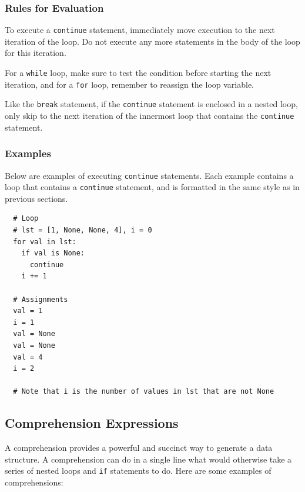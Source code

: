\documentclass{article}
\newcommand{\expr}[1]{\texttt{#1}}
\newcommand{\kw}[1]{\expr{#1}}
\begin{document}
\subsubsection{Rules for Evaluation}

  To execute a \kw{continue} statement, immediately move execution to the next iteration of the loop. Do not execute any more statements in the body of the loop for this iteration.

  For a \kw{while} loop, make sure to test the condition before starting the next iteration, and for a \kw{for} loop, remember to reassign the loop variable.

  Like the \kw{break} statement, if the \kw{continue} statement is enclosed in a nested loop, only skip to the next iteration of the innermost loop that contains the \kw{continue} statement.

\subsubsection{Examples}

  Below are examples of executing \kw{continue} statements. Each example contains a loop that contains a \kw{continue} statement, and is formatted in the same style as in previous sections.

\begin{verbatim}
  # Loop
  # lst = [1, None, None, 4], i = 0
  for val in lst:
    if val is None:
      continue
    i += 1

  # Assignments
  val = 1
  i = 1
  val = None
  val = None
  val = 4
  i = 2

  # Note that i is the number of values in lst that are not None
\end{verbatim}



\subsection{Comprehension Expressions}

  A comprehension provides a powerful and succinct way to generate a data
  structure.  A comprehension can do in a single line what would otherwise
  take a series of nested loops and \kw{if} statements to do.  Here are some
  examples of comprehensions:
\end{document}
